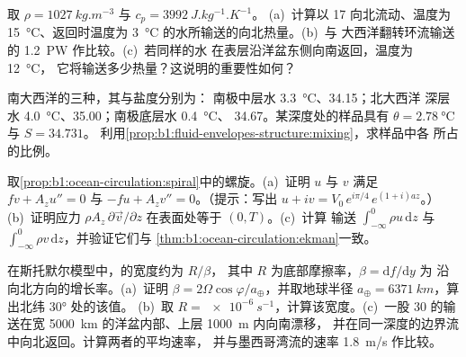 \begin{exercise}[$\star\star$]\label{exo:b1:ocean-circulation:8}
取 $\rho = \qty{1027}{kg.m^{-3}}$ 与 $c_p = \qty{3992}{J.kg^{-1}.K^{-1}}$。
(a)~计算以 \qty{17}{\sverdrup} 向北流动、温度为
\qty{15}{\celsius}、返回时温度为 \qty{3}{\celsius} 的水所输送的向北热量。(b)~与
大西洋翻转环流输送的 \qty{1.2}{PW} 作比较。(c)~若同样的水
在表层沿洋盆东侧向南返回，温度为 \qty{12}{\celsius}，
它将输送多少热量？这说明的重要性如何？
\end{exercise}

\begin{exercise}[$\star\star$]\label{exo:b1:ocean-circulation:9}
南大西洋的三种，其与盐度分别为：
南极中层水 \qty{3.3}{\celsius}、34.15；北大西洋
深层水 \qty{4.0}{\celsius}、35.00；南极底层水 \qty{0.4}{\celsius}、
34.67。某深度处的样品具有 $\theta = \qty{2.78}{\celsius}$ 与 $S = 34.731$。
利用\cref{prop:b1:fluid-envelopes-structure:mixing}，求样品中各
所占的比例。
\end{exercise}

\begin{exercise}[$\star\star\star$]\label{exo:b1:ocean-circulation:10}
取\cref{prop:b1:ocean-circulation:spiral}中的螺旋。(a)~证明 $u$ 与 $v$
满足 $f v + A_z u'' = 0$ 与 $-f u + A_z v'' = 0$。（提示：写出 $u + iv =
V_0\,e^{i\pi/4}\,e^{(1+i)az}$。）(b)~证明应力 $\rho A_z\,\partial\vec
v/\partial z$ 在表面处等于 $(0, T)$。(c)~计算
输送 $\int_{-\infty}^0 \rho u\,\mathrm dz$ 与 $\int_{-\infty}^0 \rho
v\,\mathrm dz$，并验证它们与
\cref{thm:b1:ocean-circulation:ekman}一致。
\end{exercise}

\begin{exercise}[$\star\star\star$]\label{exo:b1:ocean-circulation:11}
在斯托默尔模型中，的宽度约为 $R/\beta$，
其中 $R$ 为底部摩擦率，$\beta = \mathrm df/\mathrm dy$ 为
沿向北方向的增长率。(a)~证明 $\beta = 2\Omega
\cos\varphi/a_\oplus$，并取地球半径 $a_\oplus = \qty{6371}{km}$，算出北纬 \ang{30} 处的该值。
(b)~取 $R = \qty{e-6}{s^{-1}}$，计算该宽度。(c)~一股
\qty{30}{\sverdrup} 的输送在宽 \qty{5000}{km} 的洋盆内部、上层 \qty{1000}{m} 内向南漂移，
并在同一深度的边界流中向北返回。计算两者的平均速率，
并与墨西哥湾流的速率
\qty{1.8}{m/s} 作比较。
\end{exercise}

